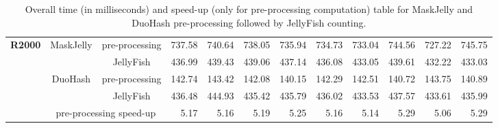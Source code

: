 \begin{sidewaystable}
\begin{tabular}{ccc | rrrrrrrrr}
		\midrule[\heavyrulewidth]
		
		\multirow{4}{*}{\textbf{R2000}}
		& \multirow{2}{*}{MaskJelly} & pre-processing & 737.58 & 740.64 & 738.05 & 735.94 & 734.73 & 733.04 & 744.56 & 727.22 & 745.75 \\
		& & JellyFish & 436.99 & 439.43 & 439.06 & 437.14 & 436.08 & 433.05 & 439.61 & 432.22 & 433.03 \\
		\cmidrule{2-12}
		& \multirow{2}{*}{DuoHash} & pre-processing & 142.74 & 143.42 & 142.08 & 140.15 & 142.29 & 142.51 & 140.72 & 143.75 & 140.89 \\
		& & JellyFish & 436.48 & 444.93 & 435.42 & 435.79 & 436.02 & 433.53 & 437.57 & 433.61 & 435.99 \\
		\cmidrule{2-12}
		& \multicolumn{2}{c|}{pre-processing speed-up} & 5.17 & 5.16 & 5.19 & 5.25 & 5.16 & 5.14 & 5.29 & 5.06 & 5.29 \\
		
		\bottomrule
	\end{tabular}
	\caption[Overall time and speed-up table for MaskJelly and DuoHash pre-processing.]{Overall time (in milliseconds) and speed-up (only for pre-processing computation) table for MaskJelly and DuoHash pre-processing followed by JellyFish counting.}
	\label{tab:time-maskjelly-duohash}
\end{sidewaystable}
